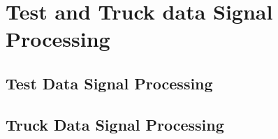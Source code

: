 \chapter{Test and Truck data Signal Processing}


\section{Test Data Signal Processing}









\section{Truck Data Signal Processing}












